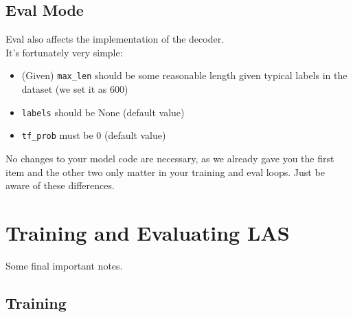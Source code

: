 \documentclass{article}
\newcommand{\ttt}[1]{\texttt{#1}}
\begin{document}
\subsection{Eval Mode}

Eval also affects the implementation of the decoder. \\

It's fortunately very simple:

\begin{itemize}
    \item (Given) \ttt{max\_len} should be some reasonable length given typical labels in the dataset (we set it as 600)
    \item \ttt{labels} should be None (default value)
    \item \ttt{tf\_prob} must be 0 (default value)
\end{itemize}

No changes to your model code are necessary, as we already gave you the first item and the other two only matter in your training and eval loops. Just be aware of these differences.

\newpage

\section{Training and Evaluating LAS}

Some final important notes.

\subsection{Training}
\end{document}
